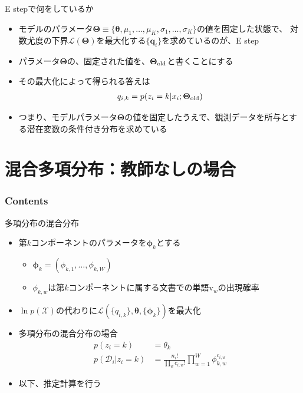 \documentclass[aspectratio=169,unicode,dvipdfmx,14pt]{beamer}
\begin{document}
\begin{frame}{E stepで何をしているか}
\begin{itemize}
\item モデルのパラメータ$\bm{\Theta} \equiv \{ \bm{\theta}, \mu_1, \ldots, \mu_K, \sigma_1, \ldots, \sigma_K \}$の値を固定した状態で、
対数尤度の下界$\mathcal{L}(\bm{\Theta})$を最大化する$\{ \bm{q}_i \}$を求めているのが、E step
\item パラメータ$\bm{\Theta}$の、固定された値を、$\bm{\Theta}_{\mbox{\scriptsize old}}$と書くことにする
\item その最大化によって得られる答えは
\begin{align}
q_{i, k} = p(z_i = k|x_i; \bm{\Theta}_{\mbox{\scriptsize old}})
\end{align}
\item つまり、モデルパラメータ$\bm{\Theta}$の値を固定したうえで、観測データを所与とする潜在変数の条件付き分布を求めている
\end{itemize}
\end{frame}


\section{混合多項分布：教師なしの場合}

\begin{frame}\frametitle{Contents}
\Large \tableofcontents[currentsection]
\end{frame}


\begin{frame}{多項分布の混合分布}
\begin{itemize}
\item 第$k$コンポーネントのパラメータを$\bm{\phi}_k$とする
\begin{itemize}
\item $\bm{\phi}_k = (\phi_{k,1},\ldots,\phi_{k,W})$
\item $\phi_{k,w}$は第$k$コンポーネントに属する文書での単語$\mbox{v}_w$の出現確率
\end{itemize}
\item $\ln p(\mathcal{X})$の代わりに$\mathcal{L}(\{q_{i,k}\},\bm{\theta}, \{ \bm{\phi}_k \})$を最大化
\item 多項分布の混合分布の場合
\begin{align}
p(z_i=k) & = \theta_k \\
p(\mathcal{D}_i | z_i=k) & = \frac{n_i!}{\prod_w c_{i,w}!} \prod_{w=1}^W \phi_{k,w}^{c_{i,w}}
\end{align}
\item 以下、推定計算を行う
\end{itemize}
\end{frame}
\end{document}
